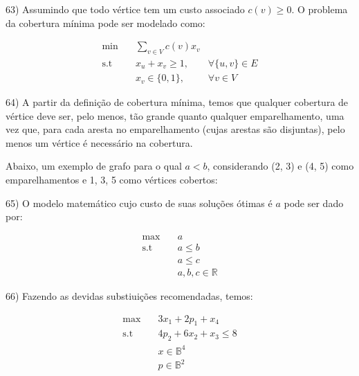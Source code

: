 \documentclass[]{article}
\begin{document}
63) Assumindo que todo vértice tem um custo associado $c(v)\geq0$. O problema da cobertura mínima pode ser modelado como:

\begin{align}
\min        &\quad  \sum_{v \in V} c(v) x_v \\
\text{s.t}  &\quad  x_u + x_v \geq 1, & \forall \{u, v\} \in E \\
            &\quad  x_v \in \{0, 1\}, & \forall v \in V
\end{align}

\vspace{0.5cm}

64) A partir da definição de cobertura mínima, temos que qualquer cobertura de vértice deve ser, pelo menos, tão grande quanto qualquer emparelhamento, uma vez que, para cada aresta no emparelhamento (cujas arestas são disjuntas), pelo menos um vértice é necessário na cobertura.

Abaixo, um exemplo de grafo para o qual $a<b$, considerando (2, 3) e (4, 5) como emparelhamentos e 1, 3, 5 como vértices cobertos:

\vspace{0.3cm}

\begin{center}
\end{center}

\vspace{0.5cm}

65) O modelo matemático cujo custo de suas soluções ótimas é $a$ pode ser dado por:

\begin{align}
\max &\quad a \\
\text{s.t}     &\quad a \leq b \\
     &\quad a \leq c \\
     &\quad a, b, c \in \mathbb{R}
\end{align}

\vspace{0.5cm}

66) Fazendo as devidas substiuições recomendadas, temos:

\begin{align}
\max        &\quad 3 x_1 + 2 p_1 + x_4 \\
\text{s.t}  &\quad 4 p_2 + 6 x_2 + x_3 \leq 8 \\
            &\quad x \in \mathbb{B}^4 \\
            &\quad p \in \mathbb{B}^2
\end{align}
\end{document}

